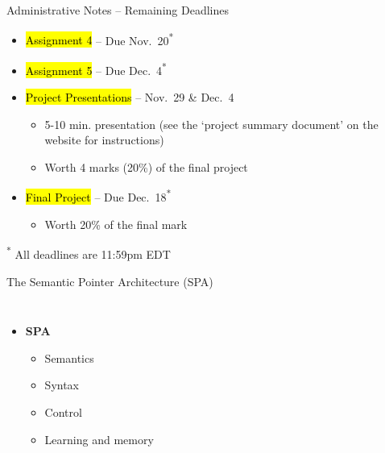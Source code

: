 \documentclass[handout,aspectratio=169]{beamer}
\begin{document}
	\begin{frame}{Administrative Notes -- Remaining Deadlines}
		\begin{itemize}
			\setlength{\itemsep}{0.5cm}
			\item \hl{Assignment 4} -- Due Nov.~20\textsuperscript{*}
			\item \hl{Assignment 5} -- Due Dec.~4\textsuperscript{*}
			\item \hl{Project Presentations} --  Nov.~29 \& Dec.~4\\[0.125cm]
			\begin{itemize}
				\setlength{\itemsep}{0.125cm}
				\item 5-10 min. presentation (see the `project summary document' on the website for instructions)
				\item Worth 4 marks (20\%) of the final project
			\end{itemize}
			\item \hl{Final Project} -- Due Dec.~18\textsuperscript{*}\\[0.125cm]
			\begin{itemize}
				\item Worth 20\% of the final mark
			\end{itemize}
		\end{itemize}
		\vspace{0.5cm}
		{\footnotesize\color{aluminium4}\textsuperscript{*} All deadlines are 11:59pm EDT}
	\end{frame}

	\begin{frame}{The Semantic Pointer Architecture (SPA)}
    \begin{columns}
      \centering
			\begin{itemize}
        \item \textbf{SPA}\\[.5cm]
				\begin{itemize}			
					\setlength{\itemsep}{0.5cm}
					\item Semantics
					\item Syntax
					\item Control
					\item Learning and memory
				\end{itemize}
			\end{itemize}
      \centering
    \end{columns}
	\end{frame}
\end{document}
